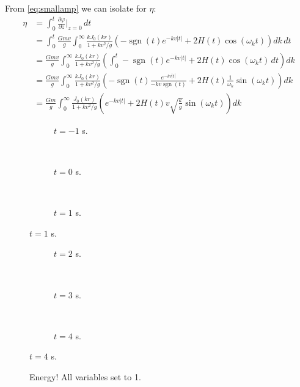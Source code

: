 \documentclass[12pt]{article}
\DeclareMathOperator{\sgn}{sgn}
\begin{document}
From \eqref{eq:smallamp} we can isolate for $\eta$:
\begin{align*}
\eta &= \int_0^t \frac{\partial \varphi}{\partial z} \bigg|_{z=0} \, dt \\
&= \int_0^t \frac{Gmv}{g} \int_0^\infty \frac{k J_0(kr)}{1+kv^2/g} \left(-\sgn(t)e^{-kv|t|} + 2H(t)\cos(\omega_k t) \right) dk \, dt \\
&= \frac{Gmv}{g} \int_0^\infty \frac{k J_0(kr)}{1+kv^2/g} \left( \int_0^t  -\sgn(t)e^{-kv|t|} + 2H(t)\cos(\omega_k t) \, dt \right) dk \\
&= \frac{Gmv}{g} \int_0^\infty \frac{k J_0(kr)}{1+kv^2/g} \left( -\sgn(t) \frac{e^{-kv|t|}}{-k v \sgn(t)} + 2H(t)\frac{1}{\omega_k}\sin(\omega_k t) \right) dk \\
&= \frac{Gm}{g} \int_0^\infty \frac{J_0(kr)}{1+kv^2/g} \left( e^{-kv|t|} + 2H(t) v \sqrt{\frac{k}{g}} \sin(\omega_k t) \right) dk
\end{align*}







\newpage

\begin{figure}[p]
\begin{centering}
 \begin{subfigure}{\textwidth}
  
  \caption{$t=-1$ s.}
 \end{subfigure} \\
 \begin{subfigure}{\textwidth}
  
  \caption{$t=0$ s.}
 \end{subfigure} \\
 \begin{subfigure}{\textwidth}
  
  \caption{$t=1$ s.}
 \end{subfigure}
\end{centering}
\end{figure}

\begin{figure}[p] \ContinuedFloat
\begin{centering}
 \begin{subfigure}{\textwidth}
  
  \caption{$t=2$ s.}
 \end{subfigure} \\
 \begin{subfigure}{\textwidth}
  
  \caption{$t=3$ s.}
 \end{subfigure} \\
  \begin{subfigure}{\textwidth}
  
  \caption{$t=4$ s.}
 \end{subfigure}
 \end{centering}
\end{figure}


\begin{figure}[p]
 
 \caption{Energy! All variables set to 1.}
\end{figure}
\end{document}
